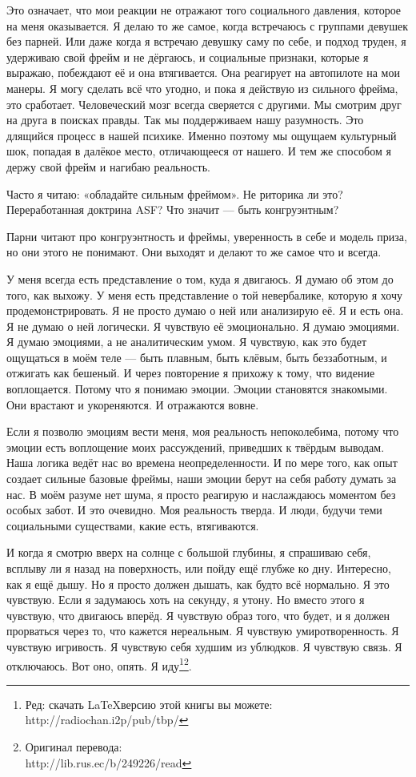 Это означает, что мои реакции не отражают того социального давления, которое на меня оказывается. Я делаю то же самое, когда встречаюсь с группами девушек без парней. Или даже когда я встречаю девушку саму по себе, и подход труден, я удерживаю свой фрейм и не дёргаюсь, и социальные признаки, которые я выражаю, побеждают её и она втягивается. Она реагирует на автопилоте на мои манеры. Я могу сделать всё что угодно, и пока я действую из сильного фрейма, это сработает. Человеческий мозг всегда сверяется с другими. Мы смотрим друг на друга в поисках правды. Так мы поддерживаем нашу разумность. Это длящийся процесс в нашей психике. Именно поэтому мы ощущаем культурный шок, попадая в далёкое место, отличающееся от нашего. И тем же способом я держу свой фрейм и нагибаю реальность.

Часто я читаю: «обладайте сильным фреймом». Не риторика ли это? Переработанная доктрина ASF? Что значит --- быть конгруэнтным?

Парни читают про конгруэнтность и фреймы, уверенность в себе и модель приза, но они этого не понимают. Они выходят и делают то же самое что и всегда.

У меня всегда есть представление о том, куда я двигаюсь. Я думаю об этом до того, как выхожу. У меня есть представление о той невербалике, которую я хочу продемонстрировать. Я не просто думаю о ней или анализирую её. Я и есть она. Я не думаю о ней логически. Я чувствую её эмоционально. Я думаю эмоциями. Я думаю эмоциями, а не аналитическим умом. Я чувствую, как это будет ощущаться в моём теле --- быть плавным, быть клёвым, быть беззаботным, и отжигать как бешеный. И через повторение я прихожу к тому, что видение воплощается. Потому что я понимаю эмоции. Эмоции становятся знакомыми. Они врастают и укореняются. И отражаются вовне.

Если я позволю эмоциям вести меня, моя реальность непоколебима, потому что эмоции есть воплощение моих рассуждений, приведших к твёрдым выводам. Наша логика ведёт нас во времена неопределенности. И по мере того, как опыт создает сильные базовые фреймы, наши эмоции берут на себя работу думать за нас. В моём разуме нет шума, я просто реагирую и наслаждаюсь моментом без особых забот. И это очевидно. Моя реальность тверда. И люди, будучи теми социальными существами, какие есть, втягиваются.

И когда я смотрю вверх на солнце с большой глубины, я спрашиваю себя, всплыву ли я назад на поверхность, или пойду ещё глубже ко дну. Интересно, как я ещё дышу. Но я просто должен дышать, как будто всё нормально. Я это чувствую. Если я задумаюсь хоть на секунду, я утону. Но вместо этого я чувствую, что двигаюсь вперёд. Я чувствую образ того, что будет, и я должен прорваться через то, что кажется нереальным. Я чувствую умиротворенность. Я чувствую игривость. Я чувствую себя худшим из ублюдков. Я чувствую связь. Я отключаюсь. Вот оно, опять. Я иду\footnote{Ред: скачать \LaTeX  версию этой книгы вы можете:\\ http://radiochan.i2p/pub/tbp/}\footnote{Оригинал перевода:\\ http://lib.rus.ec/b/249226/read}. 
